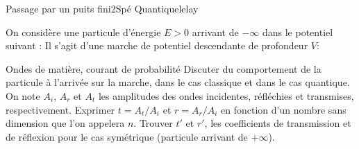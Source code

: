 \begin{exercise}{Passage par un puits fini}{2}{Spé}
{Quantique}{lelay}

On considère une particule d'énergie $E > 0$ arrivant de $-\infty$ dans le potentiel suivant : Il s'agit d'une marche de potentiel descendante de profondeur $V$:

\begin{center}
\end{center}

\begin{questions}
    \questioncours Ondes de matière, courant de probabilité
    \question Discuter du comportement de la particule à l'arrivée sur la marche, dans le cas classique et dans le cas quantique.
    \question On note $A_i$, $A_r$ et $A_t$ les amplitudes des ondes incidentes, réfléchies et transmises, respectivement. Exprimer $t = A_t/A_i$ et $r = A_r/A_i$ en fonction d'un nombre sans dimension que l'on appelera $n$.
    \question Trouver $t'$ et $r'$, les coefficients de transmission et de réflexion pour le cas symétrique (particule arrivant de $+\infty$).

    
\begin{center}
    
    
    

\end{center}
\end{questions}
\end{exercise}
